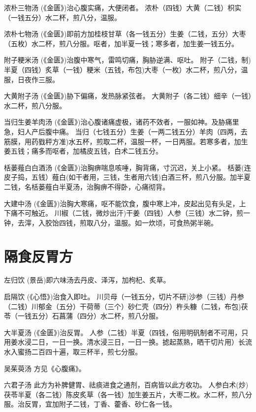 \documentclass[a4paper,12pt,UTF8,twoside]{ctexbook}
\begin{document}
    浓朴三物汤
    (《金匮》)治心腹实痛，大便闭者。
    浓朴（四钱）大黄（二钱）枳实（一钱五分）水二杯，煎八分，温服。
    
    浓朴七物汤
    (《金匮》)即前方加桂枝甘草（各一钱五分）生姜（二钱，五分）大枣（五枚）水二杯，煎八分服。呕者，加半夏一钱；寒多者，加生姜一钱五分。
    
    附子粳米汤
    (《金匮》)治腹中寒气，雷鸣切痛，胸胁逆满、呕吐。
    附子（二钱，制)半夏（四钱）炙草（一钱）粳米（五钱，布包)大枣（一枚）水二杯，煎八分，温服，日夜作三服。
    
    大黄附子汤
    (《金匮》)胁下偏痛，发热脉紧弦者。
    大黄附子（各二钱）细辛（一钱）水二杯，煎八分服。
    
    当归生姜羊肉汤
    (《金匮》)治心腹诸痛虚极，诸药不效者，一服如神。及胁痛里急，妇人产后腹中痛。
    当归（七钱五分）生姜（一两二钱五分）羊肉（四两，去筋膜，用药戥秤方准)水五杯，煎取二杯，温服一杯，一日两服。若寒多者，加生姜五钱；痛多而呕者，加橘皮五钱，白术二钱五分。
    
    栝蒌薤白白酒汤
    (《金匮》)治胸痹喘息咳唾，胸背痛，寸沉迟，关上小紧。
    栝蒌(连皮子捣，五钱）薤白(如干者用，三钱，生者用六钱)白酒三杯，煎八分服。加半夏二钱，名栝蒌薤白半夏汤，治胸痹不得卧，心痛彻背。
    
    大建中汤
    (《金匮》)治胸大寒痛，呕不能饮食，腹中寒上冲，皮起出见有头足，上下痛不可触近。
    川椒（二钱，微炒出汗)干姜（四钱）人参（三钱）水二钟，煎一钟，去滓，入胶饴四钱，煎取八分，温服。如一炊顷，可食热粥半碗。   
    
    
    \chapter{隔食反胃方}	
    
    左归饮
    (景岳)即六味汤去丹皮、泽泻，加枸杞、炙草。
    
    启隔饮
    (《心悟》)治食入即吐。
    川贝母（一钱五分，切片不研)沙参（三钱）丹参（二钱）川郁金（五分）干荷蒂（三个）砂仁壳（四分）杵头糠（二钱，布包)茯苓（一钱五分）石菖蒲（四分）水二杯，煎八分服。
    
    大半夏汤
    (《金匮》)治反胃。
    人参（二钱）半夏（四钱，俗用明矾制者不可用，只用姜水浸二日，一日一换。清水浸三日，一日一换。摅起蒸熟，晒干切片用）长流水入蜜扬二百四十遍，取三杯半，煎七分服。
    
    吴茱萸汤
    方见《心腹痛》。
    
    六君子汤
    此方为补脾健胃、祛痰进食之通剂，百病皆以此方收功。
    人参白术(炒)茯苓半夏（各二钱）陈皮炙草（各一钱）加生姜五片，大枣二枚。水二杯，煎八分服。治反胃，宜加附子二钱，丁香、藿香、砂仁各一钱。
    
\end{document}
